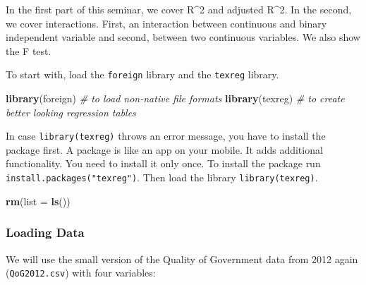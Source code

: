 \documentclass[]{article}
\newenvironment{Shaded}{\begin{snugshade}}{\end{snugshade}}
\newcommand{\KeywordTok}[1]{\textcolor[rgb]{0.13,0.29,0.53}{\textbf{#1}}}
\newcommand{\DataTypeTok}[1]{\textcolor[rgb]{0.13,0.29,0.53}{#1}}
\newcommand{\CommentTok}[1]{\textcolor[rgb]{0.56,0.35,0.01}{\textit{#1}}}
\newcommand{\NormalTok}[1]{#1}
\theoremstyle{definition}
\theoremstyle{definition}
\theoremstyle{definition}
\theoremstyle{remark}
\begin{document}
In the first part of this seminar, we cover R\^{}2 and adjusted R\^{}2.
In the second, we cover interactions. First, an interaction between
continuous and binary independent variable and second, between two
continuous variables. We also show the F test.

To start with, load the \texttt{foreign} library and the \texttt{texreg}
library.

\begin{Shaded}
\begin{Highlighting}[]
\KeywordTok{library}\NormalTok{(foreign) }\CommentTok{# to load non-native file formats}
\KeywordTok{library}\NormalTok{(texreg) }\CommentTok{# to create better looking regression tables}
\end{Highlighting}
\end{Shaded}

In case \texttt{library(texreg)} throws an error message, you have to
install the package first. A package is like an app on your mobile. It
adds additional functionality. You need to install it only once. To
install the package run \texttt{install.packages("texreg")}. Then load
the library \texttt{library(texreg)}.

\begin{Shaded}
\begin{Highlighting}[]
\KeywordTok{rm}\NormalTok{(}\DataTypeTok{list =} \KeywordTok{ls}\NormalTok{())}
\end{Highlighting}
\end{Shaded}

\subsubsection{Loading Data}\label{loading-data-1}

We will use the small version of the Quality of Government data from
2012 again (\texttt{QoG2012.csv}) with four variables:
\end{document}
